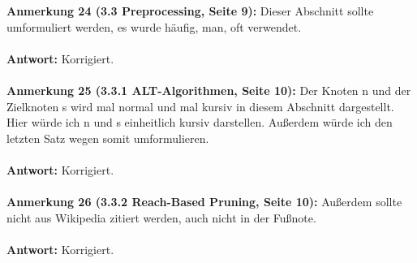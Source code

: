 \documentclass[a4paper,12pt]{book}
\begin{document}
\textbf{Anmerkung 24 (3.3 Preprocessing, Seite 9):} 
Dieser Abschnitt sollte umformuliert werden, es wurde \glqq häufig, man, oft\grqq{} verwendet. 
\\ \\
\textbf{Antwort:}
Korrigiert. 
\\ \\
\textbf{Anmerkung 25 (3.3.1 ALT-Algorithmen, Seite 10):}
Der Knoten n und der Zielknoten s wird mal normal und mal kursiv in diesem Abschnitt dargestellt. Hier würde ich n und s einheitlich kursiv darstellen. Außerdem würde ich den letzten Satz wegen \glqq somit\grqq{} umformulieren.
\\ \\
\textbf{Antwort:}
Korrigiert.
\\ \\
\textbf{Anmerkung 26 (3.3.2 Reach-Based Pruning, Seite 10):}
Außerdem sollte nicht aus Wikipedia zitiert werden, auch nicht in der Fußnote.
\\ \\
\textbf{Antwort:}
Korrigiert.
\end{document}

